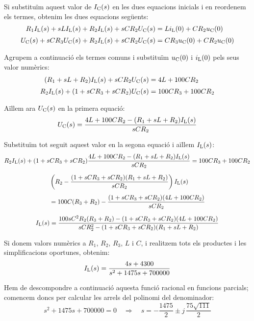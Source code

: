 \begin{exemple}
    Si substituïm aquest valor de $I_\mathrm{C}(s)$ en les dues equacions
    inicials i en reordenem els termes, obtenim les dues equacions següents:
    \begin{align*}
        R_1 I_\mathrm{L}(s) + s L I_\mathrm{L}(s)  + R_2
        I_\mathrm{L}(s) + s C R_2 U_\mathrm{C}(s) &= L i_\mathrm{L}(0) + C R_2 u_\mathrm{C}(0)\\[0.5ex]
        U_\mathrm{C}(s) + s C R_3 U_\mathrm{C}(s) + R_2 I_\mathrm{L}(s) + s C R_2 U_\mathrm{C}(s)
        &= C R_3 u_\mathrm{C}(0) + C R_2 u_\mathrm{C}(0)
    \end{align*}

    Agrupem a continuació els termes comuns i substituïm $u_\mathrm{C}(0)$ i
    $i_\mathrm{L}(0)$ pels seus valor numèrics:
    \begin{align*}
        (R_1 + s L + R_2) I_\mathrm{L}(s) + s C R_2 U_\mathrm{C}(s) &= 4 L  + 100 C R_2\\[0.5ex]
        R_2 I_\mathrm{L}(s) + (1 +s C R_3 + s C R_2) U_\mathrm{C}(s) &= 100 C R_3  + 100 C R_2
    \end{align*}

    Aïllem ara $U_\mathrm{C}(s)$ en la primera equació:
    \[
        U_\mathrm{C}(s) = \frac{4 L  + 100 C R_2 -(R_1 + s L + R_2) I_\mathrm{L}(s)}{s C R_2}
    \]

    Substituïm tot seguit aquest valor en la segona equació i aïllem
    $I_\mathrm{L}(s)$:
    \begin{gather*}
       R_2 I_\mathrm{L}(s) + (1 + s C R_3 + s C R_2) \frac{4 L  + 100 C R_2 - (R_1 + s L + R_2)I_\mathrm{L}(s)}{s C R_2} = 100 C R_3  + 100 C R_2 \\[1.5ex]
       \begin{split} &\left( R_2 - \frac{(1 +s C R_3 + s C R_2)(R_1 + s L + R_2)}{s C R_2} \right) I_\mathrm{L}(s)
        \\[1ex] &= 100 C (R_3  + R_2) - \frac{(1 +s C R_3 + s C R_2)(4 L  + 100 C R_2)}{s C
       R_2}\end{split}\\[1.5ex]
    I_\mathrm{L}(s) = \frac{100 s C^2 R_2(R_3  + R_2)- (1 +s C R_3 + s C
    R_2)(4 L  + 100 C R_2)}{s C R_2^2  -(1 +s C R_3 + s C R_2)(R_1 + s L
    + R_2)}
    \end{gather*}

    Si donem valors numèrics a $R_1$, $R_2$, $R_3$, $L$ i $C$, i
    realitzem tots els productes i les  simplificacions oportunes,
    obtenim:
    \[
    I_\mathrm{L}(s) = \frac{4 s+ 4300}{s^2 +1475 s + 700000}
    \]

    Hem de descompondre a continuació aquesta funció racional en
    funcions parcials; comencem doncs per calcular les arrels del
    polinomi del denominador:
    \[
    s^2 +1475 s + 700000 = 0 \quad\Rightarrow\quad s= -\frac{1475}{2}
    \pm j\,\frac{75\sqrt{111}}{2}
    \]


\end{exemple}
